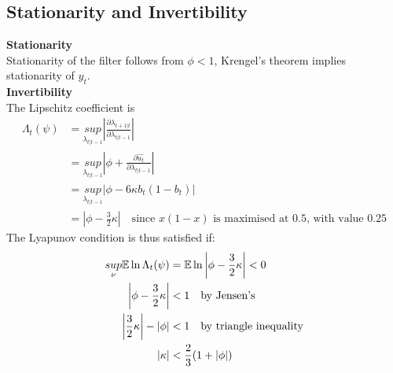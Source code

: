 \documentclass[DIV=14,titlepage=false]{scrreprt}
\begin{document}
\subsection{Stationarity and Invertibility}
\textbf{Stationarity}\\
Stationarity of the filter follows from $\phi < 1$, Krengel's theorem implies stationarity of $y_t$.\\
\textbf{Invertibility}\\
The Lipschitz coefficient is 
\begin{align*}
    \Lambda_t(\psi) &= \underset{\lambda_{t|t-1}}{sup}\left| \frac{\partial \lambda_{t+1|t}}{\partial \lambda_{t|t-1}} \right| \\
    &= \underset{\lambda_{t|t-1}}{sup}\left| \phi + \frac{\partial \hat{u_t}}{\partial \lambda_{t|t-1}} \right|\\
    &= \underset{\lambda_{t|t-1}}{sup}|\phi-6\kappa b_t (1-b_t)|\\
    &= \left|\phi-\frac{3}{2}\kappa\right| \quad \text{since $x(1-x)$ is maximised at 0.5, with value 0.25}
\end{align*}
The Lyapunov condition is thus satisfied if:
\begin{align*}
    \underset{\nu}{sup} \mathbb{E} \ln \Lambda_t(\psi) &= \mathbb{E} \ln \left|\phi-\frac{3}{2}\kappa\right| < 0\\
    \left|\phi-\frac{3}{2}\kappa\right| &< 1 \quad \text{by Jensen's}\\
    \left|\frac{3}{2}\kappa\right| - |\phi| &< 1 \quad \text{by triangle inequality} \\
    |\kappa| &< \frac{2}{3}(1+|\phi|)
\end{align*}
\end{document}
